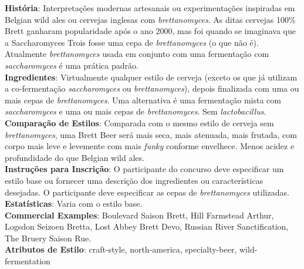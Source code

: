 \textbf{História}: Interpretações modernas artesanais ou experimentações inspiradas em Belgian wild ales ou cervejas inglesas com \textit{brettanomyces}. As ditas cervejas 100\% Brett ganharam popularidade após o ano 2000, mas foi quando se imaginava que a Saccharomyces Trois fosse uma cepa de \textit{brettanomyces} (o que não é). Atualmente \textit{brettanomyces} usada em conjunto com uma fermentação com \textit{saccharomyces} é uma prática padrão. \\
\textbf{Ingredientes}: Virtualmente qualquer estilo de cerveja (exceto os que já utilizam a co-fermentação \textit{saccharomyces} ou \textit{brettanomyces}), depois finalizada com uma ou mais cepas de \textit{brettanomyces}. Uma alternativa é uma fermentação mista com \textit{saccharomyces} e uma ou mais cepas de \textit{brettanomyces}. Sem \textit{lactobacillus}. \\
\textbf{Comparação de Estilos}: Comparada com o mesmo estilo de cerveja sem \textit{brettanomyces}, uma Brett Beer será mais seca, mais atenuada, mais frutada, com corpo mais leve e levemente com mais \textit{funky} conforme envelhece. Menos acidez e profundidade do que Belgian wild ales. \\
\textbf{Instruções para Inscrição}: O participante do concurso deve especificar um estilo base ou fornecer uma descrição dos ingredientes ou características desejadas. O participante deve especificar as cepas de \textit{brettanomyces} utilizadas. \\
\textbf{Estatísticas}: Varia com o estilo base. \\
\textbf{Commercial Examples}: Boulevard Saison Brett, Hill Farmstead Arthur, Logsdon Seizoen Bretta, Lost Abbey Brett Devo, Russian River Sanctification, The Bruery Saison Rue. \\
\textbf{Atributos de Estilo}: craft-style, north-america, specialty-beer, wild-fermentation
